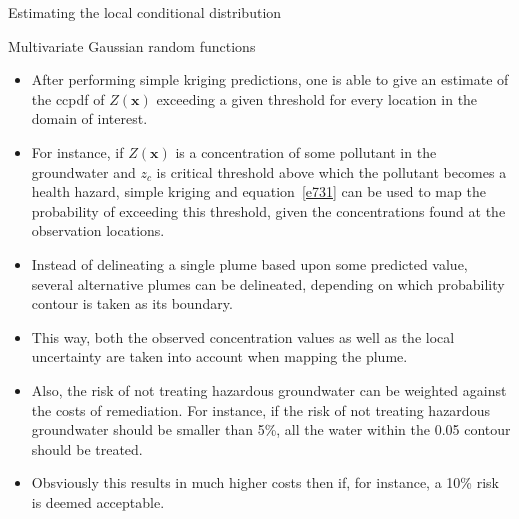 \documentclass[8pt]{beamer}
\renewcommand{\emph}[1]{\textcolor{myorange}{#1}}
\begin{document}
\begin{frame}{Estimating the local conditional distribution}
    \begin{block}{Multivariate Gaussian random functions}
    \end{block}
    \begin{itemize}
        \item After performing \emph{simple kriging predictions}, one is able to give an estimate of the \emph{ccpdf} of $Z(\mathbf{x})$ \emph{exceeding} a given \emph{threshold} for every location in the domain of interest.
        \item For instance, if $Z(\mathbf{x})$ is a \emph{concentration of some pollutant} in the groundwater and $z_c$ is \emph{critical threshold} above which the \emph{pollutant} becomes a \emph{health hazard}, \emph{simple kriging} and equation~\ref{e731} can be used to map the \emph{probability of exceeding} this \emph{threshold}, given the concentrations found at the observation locations.
        \item Instead of \emph{delineating} a \emph{single plume} based upon some \emph{predicted value}, \emph{several alternative plumes} can be delineated, depending on which \emph{probability contour} is taken as its boundary.
         \item This way, both the \emph{observed concentration} values as well as the \emph{local uncertainty} are taken into account when mapping the plume. 
         \item Also, the \emph{risk} of not treating \emph{hazardous groundwater} can be weighted against the \emph{costs of remediation}. For instance, if the risk of not treating \emph{hazardous groundwater} should be smaller than 5\%, all the water within the 0.05 contour should be treated.
         \item Obsviously this results in much higher costs then if, for instance, a 10\% \emph{risk} is deemed acceptable.
 
    \end{itemize}
\end{frame}
\end{document}
